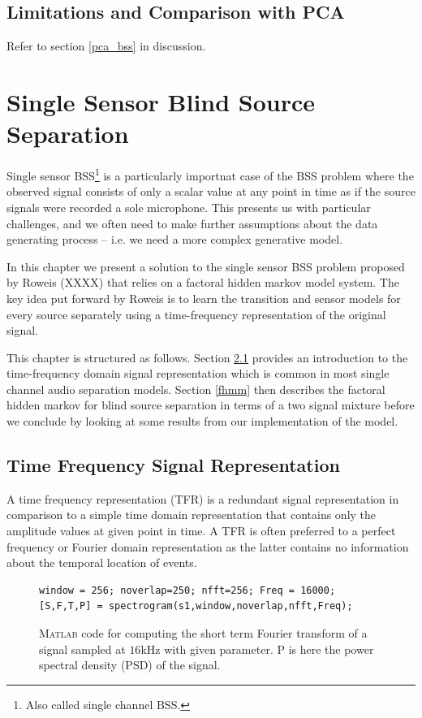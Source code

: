 \documentclass[11pt, oneside, a4paper]{report}
\begin{document}
\section{Limitations and Comparison with PCA}\label{ica_conclusions}

Refer to section \ref{pca_bss} in discussion.


\chapter{Single Sensor Blind Source Separation}\label{ssbss_chap}

Single sensor BSS\footnote{Also called single channel BSS.} is a
particularly importnat case of the BSS problem where the observed
signal consists of only a scalar value at any point in time as if the
source signals were recorded a sole microphone. This presents us with
particular challenges, and we often need to make further assumptions
about the data generating process -- i.e. we need a more complex
generative model.

In this chapter we present  a solution to the single sensor BSS
problem proposed by Roweis (XXXX)\cite{roweis} that relies on a
factoral hidden markov model system. The key idea put forward by
Roweis is to learn the transition and sensor models for every source
separately using a time-frequency  representation of the original signal.

This chapter is structured as follows. Section \ref{timeFreqRep}
provides an introduction to the time-frequency domain signal
representation which is common in most single channel audio separation
models. Section \ref{fhmm} then describes the factoral hidden
markov for blind source separation in terms of a two signal mixture
before we conclude by looking at some results from our implementation
of the model.


\section{Time Frequency Signal Representation}\label{timeFreqRep}
A time frequency representation (TFR) is a redundant signal
representation in comparison to a simple time domain representation that
contains only the amplitude values at given point in time. A TFR
is often preferred to a perfect frequency or Fourier
domain representation as the latter contains no information about the
temporal location of events.


\begin{figure}[!htpb]\label{matlab_stft}
  \begin{lstlisting}[frame=single]
window = 256; noverlap=250; nfft=256; Freq = 16000;
[S,F,T,P] = spectrogram(s1,window,noverlap,nfft,Freq);
  \end{lstlisting}
  \caption{\textsc{Matlab} code for computing the short term Fourier
    transform of a signal sampled at $16$kHz with given
    parameter. P is here the power spectral density (PSD) of
    the signal.}
  \label{mlica_code}
\end{figure}
\end{document}
